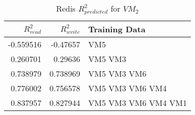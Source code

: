 \begin{table}
\centering
\caption{Redis $R_{predicted}^2$ for $VM_2$}
\begin{tabular}{|r|r|l|} \hline
$R_{read}^2$&$R_{write}^2$&Training Data\\ \hline
-0.559516 & -0.47657 & VM5 \\ \hline 
0.260701 & 0.29636 & VM5 VM3 \\ \hline 
0.738979 & 0.738969 & VM5 VM3 VM6 \\ \hline 
0.776002 & 0.756578 & VM5 VM3 VM6 VM4 \\ \hline 
0.837957 & 0.827944 & VM5 VM3 VM6 VM4 VM1 \\ \hline 
\hline\end{tabular}
\label{table:redis}
\end{table}